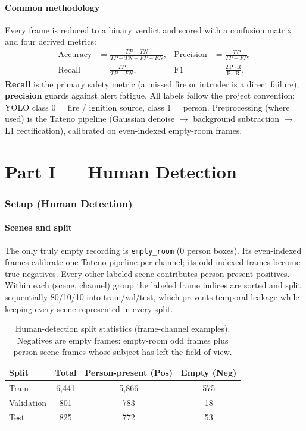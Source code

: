 \documentclass[11pt, a4paper]{article}
\begin{document}
\subsection{Common methodology}

Every frame is reduced to a binary verdict and scored with a confusion matrix
and four derived metrics:
\begin{align*}
\text{Accuracy} &= \tfrac{TP+TN}{TP+TN+FP+FN}, &
\text{Precision} &= \tfrac{TP}{TP+FP}, \\
\text{Recall} &= \tfrac{TP}{TP+FN}, &
\text{F1} &= \tfrac{2\,\text{P}\cdot\text{R}}{\text{P}+\text{R}}.
\end{align*}
\textbf{Recall} is the primary safety metric (a missed fire or intruder is a
direct failure); \textbf{precision} guards against alert fatigue. All labels
follow the project convention: YOLO class 0 = fire / ignition source,
class 1 = person. Preprocessing (where used) is the Tateno pipeline
(Gaussian denoise $\to$ background subtraction $\to$ L1 rectification),
calibrated on even-indexed empty-room frames.

\part*{Part I — Human Detection}

\section{Setup (Human Detection)}

\subsection{Scenes and split}
The only truly empty recording is \texttt{empty\_room} (0 person boxes). Its
even-indexed frames calibrate one Tateno pipeline per channel; its odd-indexed
frames become true negatives. Every other labeled scene contributes
person-present positives. Within each (scene, channel) group the labeled frame
indices are sorted and split sequentially 80/10/10 into train/val/test, which
prevents temporal leakage while keeping every scene represented in every split.

\begin{table}[H]
\centering
\caption{Human-detection split statistics (frame-channel examples). Negatives are
empty frames: empty-room odd frames plus person-scene frames whose subject has
left the field of view.}
\renewcommand{\arraystretch}{1.3}
\begin{tabular}{lccc}
\toprule
\textbf{Split} & \textbf{Total} & \textbf{Person-present (Pos)} & \textbf{Empty (Neg)} \\
\midrule
Train      & 6{,}441 & 5{,}866 & 575 \\
Validation &    801  &    783  &  18 \\
Test       &    825  &    772  &  53 \\
\bottomrule
\end{tabular}
\end{table}
\end{document}
